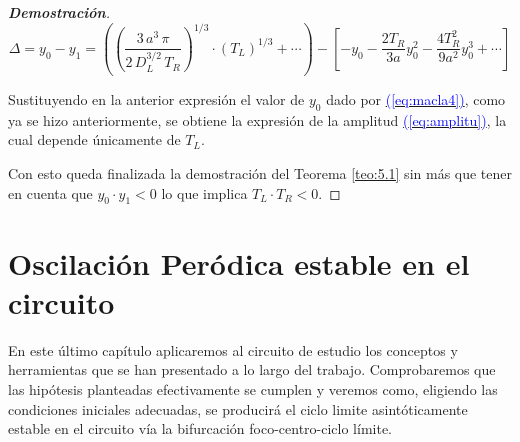 \documentclass[12pt,a4paper]{report} %
\newcommand{\eref}[1]{\hyperref[#1]{\textcolor{blue}{(\ref*{#1})}}}
\begin{document}
\begin{proof}[\textbf{Demostración}]
	\begin{equation}
		\varDelta=y_0-y_1=\left( \left( \frac{3\, a^3 \, \pi}{2\, D_L^{3/2}\, T_R} \right)^{1/3}\cdot \left(T_L\right)^{1/3}+\cdots \right) - \left[ -y_0-\frac{2T_R}{3a}y_0^2-\frac{4T_R^2}{9a^2}y_0^3+\cdots \right]
	\end{equation}\smallskip
	
	\noindent Sustituyendo en la anterior expresión el valor de $y_0$ dado por \eref{eq:macla4}, como ya se hizo anteriormente, se obtiene la expresión de la amplitud \eref{eq:amplitu}, la cual depende únicamente de $T_L$.
	

\vspace{0.5cm} Con esto queda finalizada la demostración del Teorema \ref{teo:5.1} sin más que tener en cuenta que $y_0\cdot y_1<0$ lo que implica $T_L\cdot T_R<0$.

\end{proof}
	
	\newpage
	
	\chapter{Oscilación Peródica estable en el circuito}
	\label{cap.55}
	
	En este último capítulo aplicaremos al circuito de estudio los conceptos y herramientas que se han presentado a lo largo del trabajo. Comprobaremos que las hipótesis planteadas efectivamente se cumplen y veremos como, eligiendo las condiciones iniciales adecuadas, se producirá el ciclo limite asintóticamente estable en el circuito vía la bifurcación foco-centro-ciclo límite.
	
\end{document}
